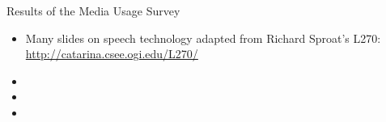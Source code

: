 \documentclass[a4paper,landscape,headrule,footrule,xetex]{foils}
\begin{document}

Results of the Media Usage Survey


\begin{itemize}
\item Many slides on speech technology adapted from Richard Sproat's L270: 
  \\ \url{http://catarina.csee.ogi.edu/L270/}
\item {}
\item {}
\item {}
\end{itemize}




\end{document}
